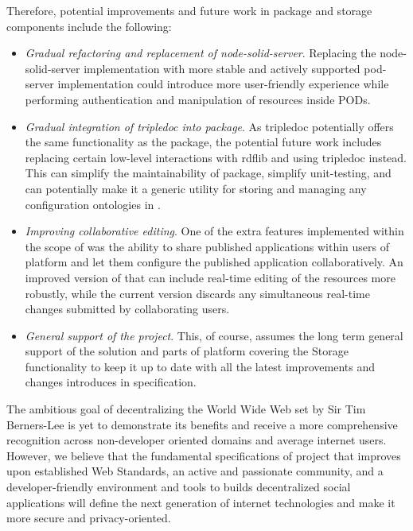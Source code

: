 Therefore, potential improvements and future work in \lpas{} package and storage components include the following:
\begin{itemize}
    \item \textit{Gradual refactoring and replacement of node-solid-server}. Replacing the node-solid-server implementation with more stable and actively supported pod-server implementation could introduce more user-friendly experience while performing authentication and manipulation of resources inside \solid{} PODs.
    \item \textit{Gradual integration of tripledoc into \lpas{} package}. As tripledoc potentially offers the same functionality as the \lpas{} package, the potential future work includes replacing certain low-level interactions with rdflib and using tripledoc instead. This can simplify the maintainability of \lpas{} package, simplify unit-testing, and can potentially make it a generic utility for storing and managing any configuration ontologies in \solid{}.
    \item \textit{Improving collaborative editing}. One of the extra features implemented within the scope of \lpas{} was the ability to share published applications within users of \lpa{} platform and let them configure the published application collaboratively. An improved version of that can include real-time editing of the resources more robustly, while the current version discards any simultaneous real-time changes submitted by collaborating users.
    \item \textit{General support of the project}. This, of course, assumes the long term general support of the solution and parts of \lpa{} platform covering the Storage functionality to keep it up to date with all the latest improvements and changes introduces in \solid{} specification.
\end{itemize}

The ambitious goal of decentralizing the World Wide Web set by Sir Tim Berners-Lee is yet to demonstrate its benefits and receive a more comprehensive recognition across non-developer oriented domains and average internet users. However, we believe that the fundamental specifications of \solid{} project that improves upon established Web Standards, an active and passionate community, and a developer-friendly environment and tools to builds decentralized social applications will define the next generation of internet technologies and make it more secure and privacy-oriented.